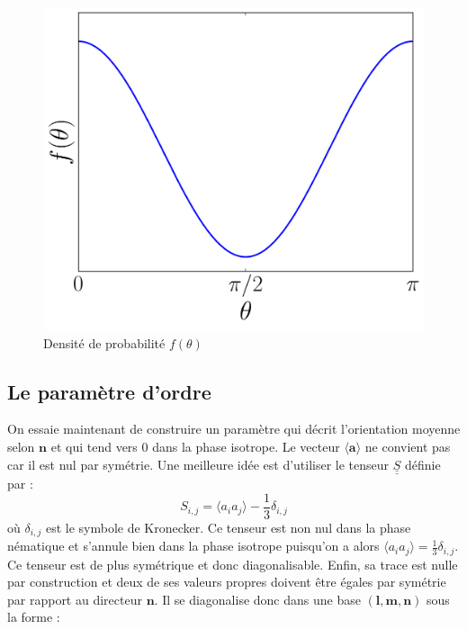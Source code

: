 \documentclass[11pt,a4paper]{article}
\numberwithin{equation}{section}
\begin{document}
\begin{figure}[h]
    \centering	    
	\includegraphics[scale=0.4]{figures/distrib.pdf}
    \caption{Densité de probabilité $f(\theta)$}
    	\label{distrib} 
\end{figure}

\subsection{Le paramètre d'ordre}
On essaie maintenant de construire un paramètre qui décrit l'orientation moyenne selon $\bm{n}$ et qui tend vers 0 dans la phase isotrope. Le vecteur $\langle \bm{a} \rangle $ ne convient pas car il est nul par symétrie. Une meilleure idée est d'utiliser le tenseur $\underline{\underline{S}}$ définie par :
\begin{equation}
S_{i,j} = \langle a_i a_j \rangle -\frac{1}{3} \delta_{i,j}
\label{tenseur}
\end{equation}
où $\delta_{i,j}$ est le symbole de Kronecker. Ce tenseur est non nul dans la phase nématique et s'annule bien dans la phase isotrope puisqu'on a alors $\langle  a_i a_j \rangle  = \frac{1}{3} \delta_{i,j}$. Ce tenseur est de plus symétrique et donc diagonalisable. Enfin, sa trace est nulle par construction et deux de ses valeurs propres doivent être égales par symétrie par rapport au directeur $\bm{n}$. Il se diagonalise donc dans une base $(\bm{l}, \bm{m}, \bm{n})$ sous la forme :
\end{document}
